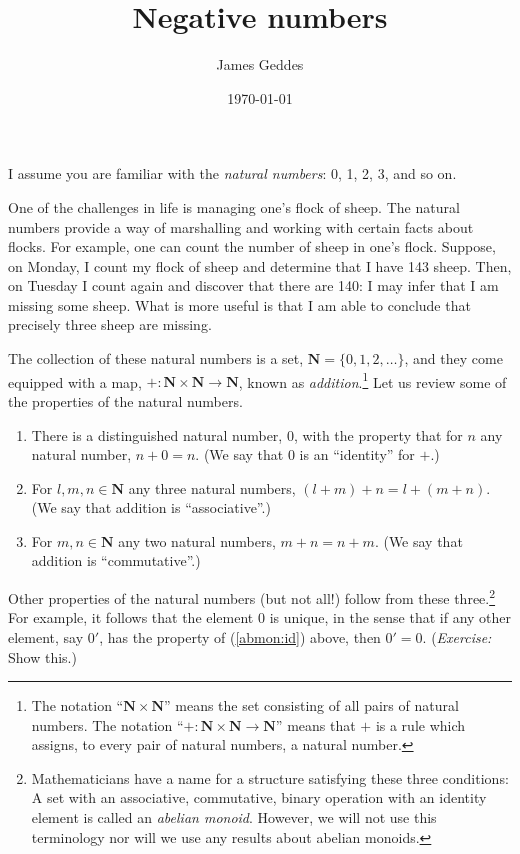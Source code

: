 \documentclass[10pt, a4paper, twocolumn]{article}
\author{James Geddes}
\date{\today}
\title{Negative numbers}
\newcommand{\set}[1]{\mathbold{#1}}
\newcommand{\N}{\set{N}}
\begin{document}
\maketitle

I assume you are familiar with the \emph{natural numbers}: 0, 1, 2, 3,
and so on.

One of the challenges in life is managing one's flock of sheep. The
natural numbers provide a way of marshalling and working with certain
facts about flocks. For example, one can count the number of sheep in
one's flock. Suppose, on Monday, I count my flock of sheep and
determine that I have 143 sheep. Then, on Tuesday I count again and
discover that there are 140: I may infer that I am missing some
sheep. What is more useful is that I am able to conclude that
precisely three sheep are missing.

The collection of these natural numbers is a set,
$\N=\{0,1,2,\dotsc\}$, and they come equipped with a map,
$+:\N\times\N\to\N$, known as \emph{addition}.\footnote{The notation
``$\N\times\N$'' means the set consisting of all pairs of natural
numbers. The notation ``$+:\N\times\N\to\N$'' means that $+$ is a rule
which assigns, to every pair of natural numbers, a natural number.}
Let us review some of the properties of the natural numbers.
\begin{enumerate}
\item There is a distinguished natural number, $0$, with the
  property that for $n$ any natural number, $n+0=n$. (We say that $0$
  is an ``identity'' for $+$.)\label{abmon:id}
\item For $l,m,n\in\N$ any three natural numbers, $(l+m)+n=l+(m+n)$. (We say
  that addition is ``associative''.)
\item For $m,n\in\N$ any two natural numbers, $m+n=n+m$. (We say that
  addition is ``commutative''.)
\end{enumerate}
Other properties of the natural numbers (but not all!) follow from
these three.\footnote{Mathematicians have a name for a structure
satisfying these three conditions: A set with an associative,
commutative, binary operation with an identity element is called an
\emph{abelian monoid}. However, we will not use this terminology nor
will we use any results about abelian monoids.} For example, it
follows that the element $0$ is unique, in the sense that if any other
element, say $0'$, has the property of (\ref{abmon:id}) above, then
$0'=0$. (\emph{Exercise:} Show this.)
\end{document}
